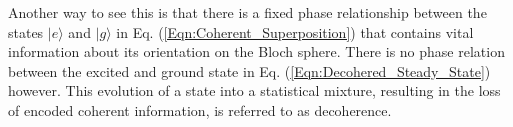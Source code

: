 Another way to see this is that there is a fixed phase relationship between the states $|e\rangle$ and $|g\rangle$ in Eq. (\ref{Eqn:Coherent_Superposition}) that contains vital information about its orientation on the Bloch sphere. There is no phase relation between the excited and ground state in Eq. (\ref{Eqn:Decohered_Steady_State}) however. This evolution of a state into a statistical mixture, resulting in the loss of encoded coherent information, is referred to as decoherence.
%









%
%
%
% 
%
%
%


